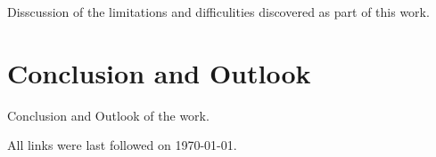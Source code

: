 \documentclass[
a4paper,
twoside,
bibliography=totoc,
headsepline,
cleardoublepage=empty,
parskip=half,
draft=false
]{scrbook}
\begin{document}
			Disscussion of the limitations and difficulities discovered as part of this work.
		
	\chapter{Conclusion and Outlook} \label{ch:conclusion_and_outlook}
	
		Conclusion and Outlook of the work.
		
	\clearpage
	
	
	
%	
%	
%	
%	
%	
%	
%	
%	
%	
%	
%	
	
	
	
	\printbibliography
	
	All links were last followed on \today.
	
	\pagestyle{empty}
	\renewcommand*{\chapterpagestyle}{empty}
	\Versicherung
\end{document}
